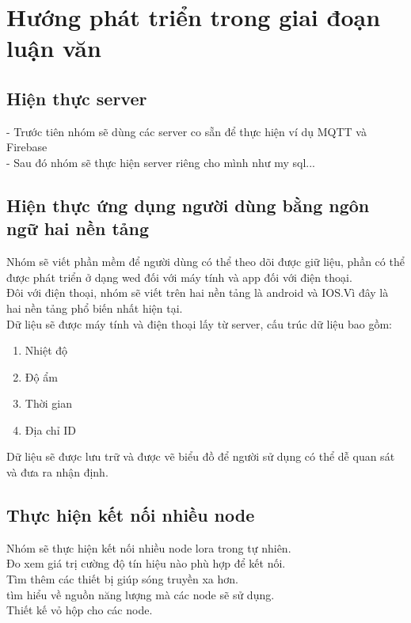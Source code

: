 \section{Hướng phát triển trong giai đoạn luận văn}
\subsection{Hiện thực server}
- Trước tiên nhóm sẽ dùng các server co sẵn để thực hiện ví dụ MQTT và Firebase\\
- Sau đó nhóm sẽ thực hiện server riêng cho mình như my sql...
\subsection{Hiện thực ứng dụng người dùng bằng ngôn ngữ hai nền tảng}
Nhóm sẽ viết phần mềm để người dùng có thể theo dõi được giữ liệu, phần có thể được phát triển ở dạng wed đối với máy tính và app đối với điện thoại.\\
Đôi với điện thoại, nhóm sẽ viết trên hai nền tảng là android và IOS.Vì đây là hai nền tảng phổ biến nhất hiện tại.\\
Dữ liệu sẽ được máy tính và điện thoại lấy từ server, cấu trúc dữ liệu bao gồm:
\begin{enumerate}
    \item Nhiệt độ
    \item Độ ẩm
    \item Thời gian
    \item Địa chỉ ID
\end{enumerate}
Dữ liệu sẽ được lưu trữ và được vẽ biểu đồ để người sử dụng có thể dễ quan sát và đưa ra nhận định.
\subsection{Thực hiện kết nối nhiều node}
Nhóm sẽ thực hiện kết nối nhiều node lora trong tự nhiên.\\
Đo xem giá trị cường độ tín hiệu nào phù hợp để kết nối.\\
Tìm thêm các thiết bị giúp sóng truyền xa hơn.\\
tìm hiểu về nguồn năng lượng mà các node sẽ sử dụng.\\
Thiết kế vỏ hộp cho các node.
